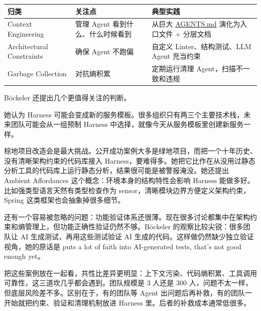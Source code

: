 \documentclass[9pt,a4paper,twocolumn]{ctexart}
\begin{document}
{\footnotesize
\begin{tabular}{|p{}|p{}|p{}|}
\hline
\textbf{归类} & \textbf{关注点} & \textbf{典型实践} \\
\hline
Context Engineering & 管理 Agent 看到什么、什么时候看到 & 从巨大 \href{http://agents.md/}{AGENTS.md} 演化为入口文件 + 分层文档 \\
\hline
Architectural Constraints & 确保 Agent 不跑偏 & 自定义 Linter、结构测试、LLM Agent 充当约束 \\
\hline
Garbage Collection & 对抗熵积累 & 定期运行清理 Agent，扫描不一致和违规 \\
\hline
\end{tabular}
}



Böckeler 还提出几个更值得关注的判断。



她认为 Harness 可能会变成新的服务模板。很多组织只有两三个主要技术栈，未来团队可能会从一组预制 Harness 中选择，就像今天从服务模板里创建新服务一样。



棕地项目改造会是最大挑战。公开成功案例大多是绿地项目，而把一个十年历史、没有清晰架构约束的代码库接入 Harness，要难得多。她把它比作在从没用过静态分析工具的代码库上运行静态分析，结果很可能是被警报淹没。她还提出 Ambient Affordances 这个概念：环境本身的结构特性会影响 Harness 能做多好。比如强类型语言天然有类型检查作为 sensor，清晰模块边界方便定义架构约束，Spring 这类框架也会抽象掉很多细节。



还有一个容易被忽略的问题：功能验证体系还很薄。现在很多讨论都集中在架构约束和熵管理上，但功能正确性验证仍然不够。Böckeler 的观察比较尖锐：很多团队让 AI 生成测试，再用这些测试验证 AI 生成的代码。这样做仍然缺少独立验证视角，她的原话是 puts a lot of faith into AI-generated tests, that's not good enough yet。



把这些案例放在一起看，共性比差异更明显：上下文污染、代码熵积累、工具调用可靠性，这三道坎几乎都会遇到。团队规模是 3 人还是 300 人，问题不太一样，但底层风险差不多。区别在于，有的团队等 Agent 出问题后再补救，有的团队一开始就把约束、验证和清理机制放进 Harness 里。后者的补救成本通常低很多。
\end{document}

